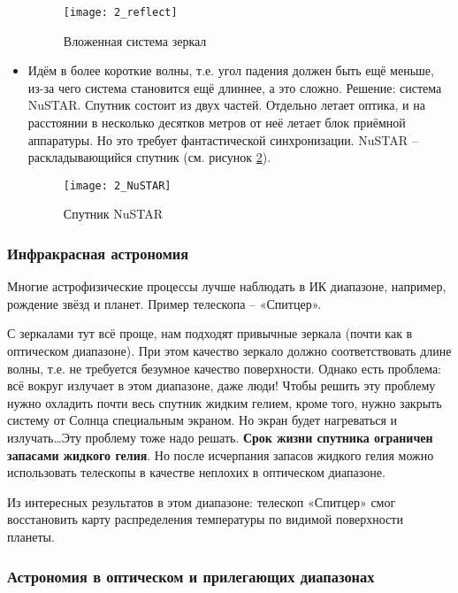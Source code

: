 \begin{itemize}
	\begin{figure}[H]
		\centering
		\texttt{[image: 2\_reflect]}
		\caption{Вложенная система зеркал}
		\label{fig:2_reflect}
	\end{figure}
	
	\item Идём в более короткие волны, т.е. угол падения должен быть ещё меньше, из-за чего система становится ещё длиннее, а это сложно. Решение: система  NuSTAR. Спутник состоит из двух частей. Отдельно летает оптика, и на расстоянии в несколько десятков метров от неё летает блок приёмной аппаратуры. Но это требует фантастической синхронизации. NuSTAR – раскладывающийся спутник (см. рисунок \ref{fig:2_NuSTAR}).
	
	\begin{figure}[H]
		\centering
		\texttt{[image: 2\_NuSTAR]}
		\caption{Спутник NuSTAR}
		\label{fig:2_NuSTAR}
	\end{figure}
\end{itemize}

\subsubsection{Инфракрасная астрономия}

Многие астрофизические процессы лучше наблюдать в ИК диапазоне, например, рождение звёзд и планет. Пример телескопа – «Спитцер».

С зеркалами тут всё проще, нам подходят привычные зеркала (почти как в оптическом диапазоне). При этом качество зеркало должно соответствовать длине волны, т.е. не требуется безумное качество поверхности. Однако есть проблема: всё вокруг излучает в этом диапазоне, даже люди! Чтобы решить эту проблему нужно охладить почти весь спутник жидким гелием, кроме того, нужно закрыть систему от Солнца специальным экраном. Но экран будет нагреваться и излучать…Эту проблему тоже надо решать. \textbf{Срок жизни спутника ограничен запасами жидкого гелия}. Но после исчерпания запасов жидкого гелия можно использовать телескопы в качестве неплохих в оптическом диапазоне.

Из интересных результатов в этом диапазоне: телескоп «Спитцер» смог восстановить карту распределения температуры по видимой поверхности планеты.

\subsubsection{Астрономия в оптическом и прилегающих диапазонах}

